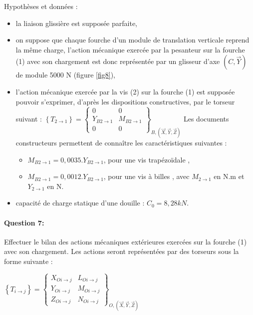 Hypothèses et données :
\begin{itemize}
 \item la liaison glissière est supposée parfaite,
 \item on suppose que chaque fourche d'un module de translation verticale reprend la même charge, l'action mécanique exercée par la pesanteur sur la fourche (1) avec son chargement est donc représentée par un glisseur d'axe $(C,\overrightarrow{Y})$ de module 5000 N (figure \ref{fig8}),
 \item l'action mécanique exercée par la vis (2) sur la fourche (1) est supposée pouvoir s'exprimer, d'après les dispositions constructives, par le torseur suivant :
$\left\{T_{2\rightarrow 1}\right\}=\left\{\begin{array}{cc}0 & 0 \\ Y_{B 2\rightarrow 1} & M_{B 2\rightarrow 1} \\ 0 & 0\end{array}\right\}_{B,(\overrightarrow{X},\overrightarrow{Y},\overrightarrow{Z})}$
Les documents constructeurs permettent de connaître les caractéristiques suivantes :
\begin{itemize}
 \item $M_{B 2\rightarrow 1}=0,0035.Y_{B 2\rightarrow 1}$, pour une \og vis trapézoïdale \fg,
 \item $M_{B 2\rightarrow 1}=0,0012.Y_{B 2\rightarrow 1}$, pour une \og vis à billes \fg, avec $M_{2\rightarrow1}$ en N.m et $Y_{2\rightarrow1}$ en N.
\end{itemize}
 \item capacité de charge statique d'une douille : $C_0=8,28kN$.
\end{itemize}

\paragraph{Question 7:} Effectuer le bilan des actions mécaniques extérieures exercées sur la fourche (1) avec son chargement. Les actions seront représentées par des torseurs sous la forme suivante :

$\left\{T_{i\rightarrow j}\right\}=\left\{\begin{array}{cc} X_{O i\rightarrow j} & L_{O i\rightarrow j} \\ Y_{O i\rightarrow j} & M_{O i\rightarrow j} \\ Z_{O i\rightarrow j} & N_{O i\rightarrow j} \end{array}\right\}_{O,(\overrightarrow{X},\overrightarrow{Y},\overrightarrow{Z})}$

